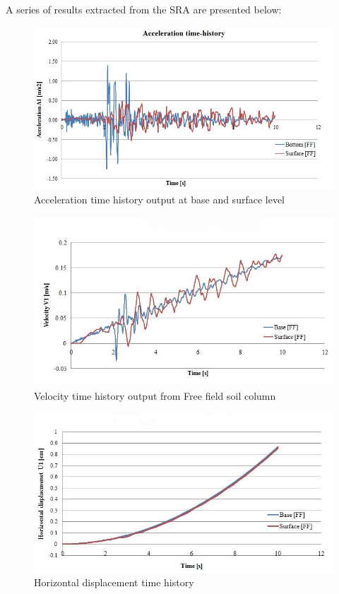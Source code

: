 	A series of results extracted from the SRA are presented below:
		\begin{figure}[h!]
			\centering
			\includegraphics[width=0.8\linewidth]{"acc_FF"}
			\caption{Acceleration time history output at base and surface level}
			\label{Acc_ff}
		\end{figure} 
		
		\begin{figure}[h!]
				\centering
				\includegraphics[width=0.8\linewidth]{"velocity_FF"}
				\caption{Velocity time history output from Free field soil column}
				\label{velo}
			\end{figure} 
			
		\begin{figure}[!h]
					\centering
					\includegraphics[width=0.7\linewidth]{"DIsp_ff"}
					\caption{Horizontal displacement time history}
					\label{disp_ff}
				\end{figure} 
	
